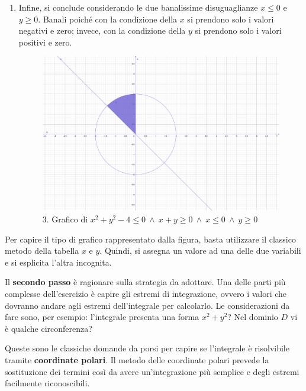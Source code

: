 \documentclass[a4paper]{article}
\begin{document}
\begin{enumerate}
		\item Infine, si conclude considerando le due banalissime disuguaglianze $x \le 0$ e $y \ge 0$. Banali poiché con la condizione della $x$ si prendono solo i valori negativi e zero; invece, con la condizione della $y$ si prendono solo i valori positivi e zero.
		\begin{figure}[!htp]
			\centering
			\includegraphics[width=\textwidth]{img/grafico-ex6-3.pdf}
			\caption*{3. Grafico di $x^{2} + y^{2} - 4 \le 0 \: \land \: x+y \ge 0 \: \land \: x \le 0 \: \land \: y \ge 0$}
			\label{fig: grafico ex6-3}
		\end{figure}
	\end{enumerate}
	Per capire il tipo di grafico rappresentato dalla figura, basta utilizzare il classico metodo della tabella $x$ e $y$. Quindi, si assegna un valore ad una delle due variabili e si esplicita l'altra incognita.\newpage

	\noindent
	Il \textbf{secondo passo} è ragionare sulla strategia da adottare. Una delle parti più complesse dell'esercizio è capire gli estremi di integrazione, ovvero i valori che dovranno andare agli estremi dell'integrale per calcolarlo. Le considerazioni da fare sono, per esempio: l'integrale presenta una forma $x^{2}+y^{2}$? Nel dominio $D$ vi è qualche circonferenza?
	
	Queste sono le classiche domande da porsi per capire se l'integrale è risolvibile tramite \textbf{coordinate polari}. Il metodo delle coordinate polari prevede la sostituzione dei termini così da avere un'integrazione più semplice e degli estremi facilmente riconoscibili.\newline
\end{document}
